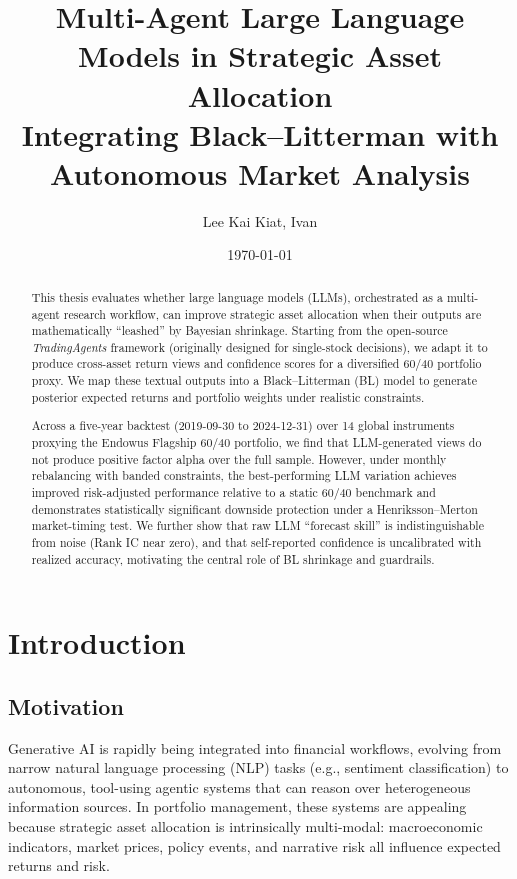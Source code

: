 \documentclass[12pt]{report}
\title{Multi-Agent Large Language Models in Strategic Asset Allocation\\\large Integrating Black--Litterman with Autonomous Market Analysis}
\author{Lee Kai Kiat, Ivan}
\date{\today}
\begin{document}
\maketitle

\begin{abstract}
    This thesis evaluates whether large language models (LLMs), orchestrated as a multi-agent research workflow, can improve strategic asset allocation when their outputs are mathematically ``leashed'' by Bayesian shrinkage.
    Starting from the open-source \emph{TradingAgents} framework (originally designed for single-stock decisions), we adapt it to produce cross-asset return views and confidence scores for a diversified 60/40 portfolio proxy.
    We map these textual outputs into a Black--Litterman (BL) model to generate posterior expected returns and portfolio weights under realistic constraints.

    Across a five-year backtest (2019-09-30 to 2024-12-31) over 14 global instruments proxying the Endowus Flagship 60/40 portfolio, we find that LLM-generated views do not produce positive factor alpha over the full sample.
    However, under monthly rebalancing with banded constraints, the best-performing LLM variation achieves improved risk-adjusted performance relative to a static 60/40 benchmark and demonstrates statistically significant downside protection under a Henriksson--Merton market-timing test.
    We further show that raw LLM ``forecast skill'' is indistinguishable from noise (Rank IC near zero), and that self-reported confidence is uncalibrated with realized accuracy, motivating the central role of BL shrinkage and guardrails.
\end{abstract}

\tableofcontents
\listoffigures
\listoftables

\chapter{Introduction}
\section{Motivation}
Generative AI is rapidly being integrated into financial workflows, evolving from narrow natural language processing (NLP) tasks (e.g., sentiment classification) to autonomous, tool-using agentic systems that can reason over heterogeneous information sources.
In portfolio management, these systems are appealing because strategic asset allocation is intrinsically multi-modal: macroeconomic indicators, market prices, policy events, and narrative risk all influence expected returns and risk.
\end{document}
